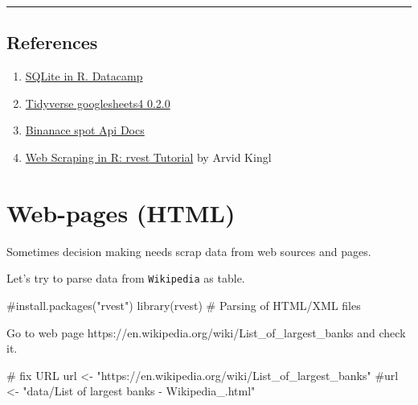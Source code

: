 \documentclass[
  letterpaper,
  DIV=11,
  numbers=noendperiod]{scrreprt}
\newenvironment{Shaded}{\begin{snugshade}}{\end{snugshade}}
\newcommand{\CommentTok}[1]{\textcolor[rgb]{0.37,0.37,0.37}{#1}}
\newcommand{\FunctionTok}[1]{\textcolor[rgb]{0.28,0.35,0.67}{#1}}
\newcommand{\NormalTok}[1]{\textcolor[rgb]{0.00,0.23,0.31}{#1}}
\newcommand{\OtherTok}[1]{\textcolor[rgb]{0.00,0.23,0.31}{#1}}
\newcommand{\StringTok}[1]{\textcolor[rgb]{0.13,0.47,0.30}{#1}}
\providecommand{\tightlist}{%
  \setlength{\itemsep}{0pt}\setlength{\parskip}{0pt}}\usepackage{longtable,booktabs,array}
\begin{document}
\begin{center}\rule{0.5\linewidth}{0.5pt}\end{center}

\section{References}\label{references-5}

\begin{enumerate}
\def\labelenumi{\arabic{enumi}.}
\tightlist
\item
  \href{https://www.datacamp.com/community/tutorials/sqlite-in-r}{SQLite
  in R. Datacamp}
\item
  \href{https://www.tidyverse.org/blog/2020/05/googlesheets4-0-2-0/}{Tidyverse
  googlesheets4 0.2.0}
\item
  \href{https://github.com/binance/binance-spot-api-docs/blob/master/rest-api.md\#klinecandlestick-data}{Binanace
  spot Api Docs}
\item
  \href{https://www.datacamp.com/community/tutorials/r-web-scraping-rvest}{Web
  Scraping in R: rvest Tutorial} by Arvid Kingl
\end{enumerate}

\chapter{Web-pages (HTML)}\label{web-pages-html}

Sometimes decision making needs scrap data from web sources and pages.

Let's try to parse data from \texttt{Wikipedia} as table.

\begin{Shaded}
\begin{Highlighting}[]
\CommentTok{\#install.packages("rvest")}
\FunctionTok{library}\NormalTok{(rvest) }\CommentTok{\# Parsing of HTML/XML files}
\end{Highlighting}
\end{Shaded}

Go to web page https://en.wikipedia.org/wiki/List\_of\_largest\_banks
and check it.

\begin{Shaded}
\begin{Highlighting}[]
\CommentTok{\# fix URL}
\NormalTok{url }\OtherTok{\textless{}{-}} \StringTok{"https://en.wikipedia.org/wiki/List\_of\_largest\_banks"}
\CommentTok{\#url \textless{}{-} "data/List of largest banks {-} Wikipedia\_.html"}
\end{Highlighting}
\end{Shaded}
\end{document}
